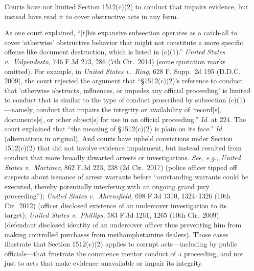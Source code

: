 Courts have not limited Section 1512(c)(2) to conduct that impairs evidence, but instead have read it to cover obstructive acts in any form.

As one court explained, “[t]his expansive subsection operates as a catch-all to cover ‘otherwise’ obstructive behavior that might not constitute a more specific offense like document destruction, which is listed in (c)(1).”
\textit{United States v.\ Volpendesto}, 746 F.3d 273, 286 (7th Cir.~2014) (some quotation marks omitted).
For example, in \textit{United States v.\ Ring}, 628 F. Supp.~2d 195 (D.D.C. 2009), the court rejected the argument that “\S 1512(c)(2)’s reference to conduct that ‘otherwise obstructs, influences, or impedes any official proceeding’ is limited to conduct that is similar to the type of conduct proscribed by subsection (c)(1)---namely, conduct that impairs the integrity or availability of ‘record[s], documents[s], or other object[s] for use in an official proceeding.”
\textit{Id.} at 224.
The court explained that “the meaning of \S 1512(c)(2) is plain on its face.”
\textit{Id.} (alternations in original), And courts have upheld convictions under Section 1512(c)(2) that did not involve evidence impairment, but instead resulted from conduct that more broadly thwarted arrests or investigations.
\textit{See, e.g., United States v.\ Martinez}, 862 F.3d 223, 238 (2d Cir.~2017) (police officer tipped off suspects about issuance of arrest warrants before “outstanding warrants could be executed, thereby potentially interfering with an ongoing grand jury proceeding”);
\textit{United States v.\ Ahrensfield}, 698 F.3d 1310, 1324--1326 (10th Cir.~2012) (officer disclosed existence of an undercover investigation to its target);
\textit{United States v.\ Phillips}, 583 F.3d 1261, 1265 (10th Cir.~2009) (defendant disclosed identity of an undercover officer thus preventing him from making controlled purchases from methamphetamine dealers).
Those cases illustrate that Section 1512(c)(2) applies to corrupt acts---including by public officials---that frustrate the commence mentor conduct of a proceeding, and not just to acts that make evidence unavailable or impair its integrity.

